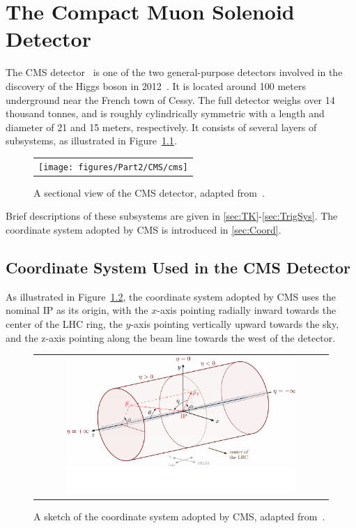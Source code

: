 \chapter{The Compact Muon Solenoid Detector}
\label{chap:CMS}

The \ac{CMS} detector~\cite{CMS:2008xjf} is one of the two general-purpose detectors involved in the discovery of the Higgs boson in 2012~\cite{ATLAS:2012yve,CMS:2012qbp}. It is located around 100 meters underground near the French town of Cessy. The full detector weighs over 14 thousand tonnes, and is roughly cylindrically symmetric with a length and diameter of 21 and 15 meters, respectively. It consists of several layers of subsystems, as illustrated in Figure~\ref{fig:CMS}.

\begin{figure}[tbh!]
 \begin{center}
 \begin{tabular}{c}
 \texttt{[image: figures/Part2/CMS/cms]}
 \end{tabular}
 \caption{A sectional view of the \ac{CMS} detector, adapted from~\cite{Sakuma:2013jqa}.}
 \label{fig:CMS}
 \end{center}
\end{figure}

Brief descriptions of these subsystems are given in \autoref{sec:TK}-\autoref{sec:TrigSys}. The coordinate system adopted by \ac{CMS} is introduced in \autoref{sec:Coord}.

\section{Coordinate System Used in the CMS Detector}
\label{sec:Coord}

As illustrated in Figure~\ref{fig:axis3D}, the coordinate system adopted by \ac{CMS} uses the nominal \ac{IP} as its origin, with the $x$-axis pointing radially inward towards the center of the \ac{LHC} ring, the $y$-axis pointing vertically upward towards the sky, and the z-axis pointing along the beam line towards the west of the detector.

\begin{figure}[tbh!]
 \begin{center}
 \begin{tabular}{c}
 \includegraphics[width=0.8\textwidth]{figures/Part2/CMS/axis3D_CMS-004}
 \end{tabular}
 \caption{A sketch of the coordinate system adopted by \ac{CMS}, adapted from~\cite{tikz:3D}.}
 \label{fig:axis3D}
 \end{center}
\end{figure}

